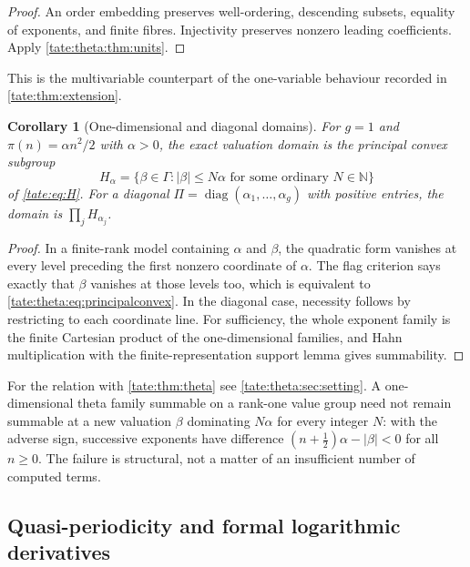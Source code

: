 \documentclass[11pt,letterpaper]{article}
\newtheorem{corollary}[corollary]{Corollary}
\theoremstyle{definition}
\newcommand{\N}{\mathbb N}
\begin{document}
\begin{proof}
An order embedding preserves well-ordering, descending subsets, equality of
exponents, and finite fibres. Injectivity preserves nonzero leading
coefficients. Apply \cref{tate:theta:thm:units}.
\end{proof}

This is the multivariable counterpart of the one-variable behaviour recorded
in \cref{tate:thm:extension}.

\begin{corollary}[One-dimensional and diagonal domains]\label{tate:theta:cor:rankone}
For $g=1$ and $\pi(n)=\alpha n^2/2$ with $\alpha>0$, the exact valuation
domain is the principal convex subgroup
\begin{equation}
 H_\alpha=\{\beta\in\Gamma:|\beta|\le N\alpha
                  \text{ for some ordinary }N\in\N\}
 \label{tate:theta:eq:principalconvex}
\end{equation}
of \eqref{tate:eq:H}. For a diagonal $\Pi=\operatorname{diag}(\alpha_1,\ldots,\alpha_g)$
with positive entries, the domain is $\prod_jH_{\alpha_j}$.
\end{corollary}

\begin{proof}
In a finite-rank model containing $\alpha$ and $\beta$, the quadratic form
vanishes at every level preceding the first nonzero coordinate of $\alpha$.
The flag criterion says exactly that $\beta$ vanishes at those levels too,
which is equivalent to \eqref{tate:theta:eq:principalconvex}. In the
diagonal case, necessity follows by restricting to each coordinate line.
For sufficiency, the whole exponent family is the finite Cartesian product
of the one-dimensional families, and Hahn multiplication with the
finite-representation support lemma gives summability.
\end{proof}

For the relation with \cref{tate:thm:theta} see
\cref{tate:theta:sec:setting}. A one-dimensional theta family summable on
a rank-one value group need not remain summable at a new valuation
$\beta$ dominating $N\alpha$ for every integer $N$: with the adverse sign,
successive exponents have difference $(n+\tfrac12)\alpha-|\beta|<0$ for
all $n\ge0$. The failure is structural, not a matter of an insufficient
number of computed terms.

\subsection{Quasi-periodicity and formal logarithmic derivatives}
\end{document}

